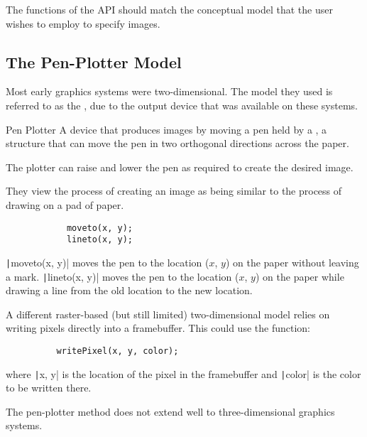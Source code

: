 \documentclass[\main/notes.tex]{subfiles}
\begin{document}
      The functions of the API should match the conceptual model
      that the user wishes to employ to specify images.

      \subsection{The Pen-Plotter Model}
        Most early graphics systems were two-dimensional.
        The model they used is referred to as the \mbox{},
        due to the output device that was available on these systems.

        \begin{definition}{Pen Plotter}
          A device that produces images by moving a pen held by a ,
          a structure that can move the pen in two orthogonal directions across the paper.

          The plotter can raise and lower the pen as required to create the desired image.

          They view the process of creating an image as being similar to the process of
          drawing on a pad of paper.
        \end{definition}

        \begin{example}
          \begin{verbatim}
            moveto(x, y);
            lineto(x, y);
          \end{verbatim}
          \texttt|moveto(x, y)| moves the pen to the location ($x$, $y$)
          on the paper without leaving a mark.
          \texttt|lineto(x, y)| moves the pen to the location ($x$, $y$)
          on the paper while drawing a line from the old location to the new location.
        \end{example}

        A different raster-based (but still limited) two-dimensional model
        relies on writing pixels directly into a framebuffer.
        This could use the function:
        \begin{verbatim}
          writePixel(x, y, color);
        \end{verbatim}
        where \texttt|x, y| is the location of the pixel in the framebuffer
        and \texttt|color| is the color to be written there.

        The pen-plotter method does not extend well to three-dimensional graphics systems.
\end{document}
